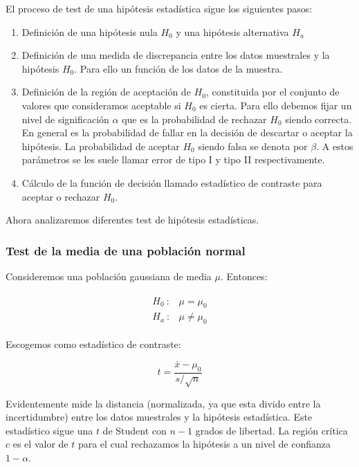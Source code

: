 \documentclass[12pt,a4paper]{book}
\begin{document}
El proceso de test de una hipótesis estadística sigue los siguientes pasos:

\begin{enumerate}
\item Definición de una hipótesis nula $H_0$ y una hipótesis alternativa $H_a$
\item Definición de una medida de discrepancia entre los datos muestrales y la hipótesis $H_0$. Para ello un función de los datos de la muestra.
\item  Definición de la región de aceptación de $H_0$, constituida por el conjunto de valores que consideramos aceptable si $H_0$ es cierta. Para ello debemos fijar un nivel de significación $\alpha$ que es la probabilidad de rechazar $H_0$ siendo correcta. En general es la probabilidad de fallar en la decisión de descartar o aceptar la hipótesis. La probabilidad de aceptar $H_0$ siendo falsa se denota por $\beta$. A estos parámetros se les suele llamar error de tipo I y tipo II respectivamente.
\item Cálculo de la función de decisión llamado estadístico de contraste para aceptar o rechazar $H_0$.
\end{enumerate}

Ahora analizaremos diferentes test de hipótesis estadísticas.


\subsubsection{Test de la media de una población normal}

Consideremos una población gaussiana de media $\mu$. Entonces:

\begin{gather}
\begin{array}{ll}
H_0 \ : & \mu = \mu_0 \\
H_a \ : & \mu \neq \mu_0
\end{array}
\end{gather}

Escogemos como estadístico de contraste: 

$$ t = \dfrac{\bar{x}-\mu_0}{s/\sqrt{n}} $$

Evidentemente mide la distancia (normalizada, ya que esta divido entre la incertidumbre) entre los datos muestrales y la hipótesis estadística. Este estadístico sigue una $t$ de Student con $n-1$ grados de libertad. La región crítica $c$ es el valor de $t$ para el cual rechazamos la hipótesis a un nivel de confianza $1-\alpha$. 
\end{document}
